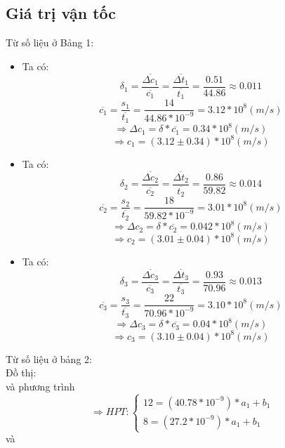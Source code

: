 \documentclass{article}[12pt]
\begin{document}
	\subsection{Giá trị vận tốc}
	Từ số liệu ở Bảng 1: \\
	\begin{itemize}
	    \item Ta có: \makebox[2.5cm]{\[{S_1} = 14(m)\]}
	    \[{\delta _1} = \frac{{\overline {\Delta {c_1}} }}{{\overline {{c_1}} }} = \frac{{\overline {\Delta {t_1}} }}{{\overline {{t_1}} }} = \frac{{0.51}}{{44.86}} \approx 0.011\]
	    \[\overline {{c_1}}  = \frac{{{s_1}}}{{\overline {{t_1}} }} = \frac{{14}}{{44.86*{{10}^{ - 9}}}} = 3.12*{10^8}(m/s)\]
	    \[ \Rightarrow \Delta {c_1} = \delta *\overline {{c_1}}  = 0.34*{10^8}(m/s)\]
	    \[ \Rightarrow {c_1} = (3.12 \pm 0.34)*{10^8}\left( {m/s} \right)\]
	    \item Ta có: \makebox[2.5cm]{\[{S_2} = 18(m)\]}
	    \[{\delta _2} = \frac{{\overline {\Delta {c_2}} }}{{\overline {{c_2}} }} = \frac{{\overline {\Delta {t_2}} }}{{\overline {{t_2}} }} = \frac{{0.86}}{{59.82}} \approx 0.014\]
	    \[\overline {{c_2}}  = \frac{{{s_2}}}{{\overline {{t_2}} }} = \frac{{18}}{{59.82*{{10}^{ - 9}}}} = 3.01*{10^8}(m/s)\]
	    \[ \Rightarrow \Delta {c_2} = \delta *\overline {{c_2}}  = 0.042*{10^8}(m/s)\]
	    \[ \Rightarrow {c_2} = (3.01 \pm 0.04)*{10^8}\left( {m/s} \right)\]
	    \item Ta có: \makebox[2.5cm]{\[{S_3} = 22(m)\]}
	    \[{\delta _3} = \frac{{\overline {\Delta {c_3}} }}{{\overline {{c_3}} }} = \frac{{\overline {\Delta {t_3}} }}{{\overline {{t_3}} }} = \frac{{0.93}}{{70.96}} \approx 0.013\]
	    \[\overline {{c_3}}  = \frac{{{s_3}}}{{\overline {{t_3}} }} = \frac{{22}}{{70.96*{{10}^{ - 9}}}} = 3.10*{10^8}(m/s)\]
	    \[ \Rightarrow \Delta {c_3} = \delta *\overline {{c_3}}  = 0.04*{10^8}(m/s)\]
	    \[ \Rightarrow {c_3} = (3.10 \pm 0.04)*{10^8}\left( {m/s} \right)\]
	\end{itemize}
		\fontsize{14.5pt}{16.5pt}\selectfont Từ số liệu ở bảng 2: \\
	    Đồ thị: \makebox[2.5cm]{\[\Delta S = f(\Delta t)\]} \\ và phương trình \makebox[2.5cm]{\[y = ax + b\]}
	    \[ \Rightarrow HPT:\left\{ {\begin{array}{*{20}{c}}
        {12 = (40.78*{{10}^{ - 9}})*{a_1} + {b_1}}\\
        {8 = (27.2*{{10}^{ - 9}})*{a_1} + {b_1}}
        \end{array}} \right.\]
        và \\
\end{document}
